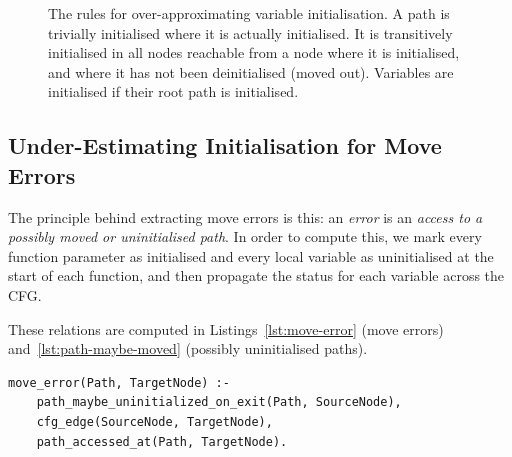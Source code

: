 \documentclass[11pt,a4paper,twoside,openany,draft]{report}
\newenvironment{sourcecode}{\captionsetup{type=listing}}{}
\begin{document}
\begin{figure}
\caption[Rules for Over-Approximating Variable Initialisation]{The rules for
  over-approximating variable initialisation. A path is trivially initialised
  where it is actually initialised. It is transitively initialised in all nodes
  reachable from a node where it is initialised, and where it has not been
  deinitialised (moved out). Variables are initialised if their root path is
  initialised.}\label{fig:var-initialised}
\end{figure}

\subsection{Under-Estimating Initialisation for Move
  Errors}\label{sec:move-errors}

The principle behind extracting move errors is this: an \textit{error} is an
\textit{access to a possibly moved or uninitialised path}. In order to compute
this, we mark every function parameter as initialised and every local variable
as uninitialised at the start of each function, and then propagate the status
for each variable across the CFG.

These relations are computed in Listings~\ref{lst:move-error} (move errors)
and~\ref{lst:path-maybe-moved} (possibly uninitialised paths).

\begin{sourcecode}
  \label{lst:move-error}
\begin{verbatim}
move_error(Path, TargetNode) :-
    path_maybe_uninitialized_on_exit(Path, SourceNode),
    cfg_edge(SourceNode, TargetNode),
    path_accessed_at(Path, TargetNode).
\end{verbatim}
\end{sourcecode}
\end{document}
